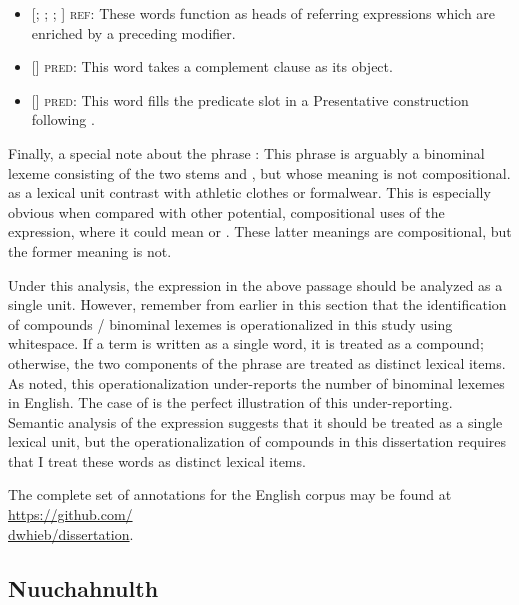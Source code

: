 \begin{itemize}
  \item {[; ; ; ]} \textsc{ref:} These words function as heads of referring expressions which are enriched by a preceding modifier.
  \item {[]} \textsc{pred:} This word takes a complement clause as its object.
  \item {[]} \textsc{pred:} This word fills the predicate slot in a Presentative \parencite[1408]{Quirketal1985} construction following .
\end{itemize}

Finally, a special note about the phrase : This phrase is arguably a binominal lexeme consisting of the two stems  and , but whose meaning is not compositional.  as a lexical unit contrast with athletic clothes or formalwear. This is especially obvious when compared with other potential, compositional uses of the expression, where it could mean  or . These latter meanings are compositional, but the former meaning is not.

Under this analysis, the expression  in the above passage should be analyzed as a single unit. However, remember from earlier in this section that the identification of compounds / binominal lexemes is operationalized in this study using whitespace. If a term is written as a single word, it is treated as a compound; otherwise, the two components of the phrase are treated as distinct lexical items. As noted, this operationalization under-reports the number of binominal lexemes in English. The case of  is the perfect illustration of this under-reporting. Semantic analysis of the expression  suggests that it should be treated as a single lexical unit, but the operationalization of compounds in this dissertation requires that I treat these words as distinct lexical items.

The complete set of annotations for the English corpus may be found at \href{https://github.com/dwhieb/dissertation}{https://github.com/\\dwhieb/dissertation}.

\subsection{Nuuchahnulth}
\label{sec:3.3.3}

